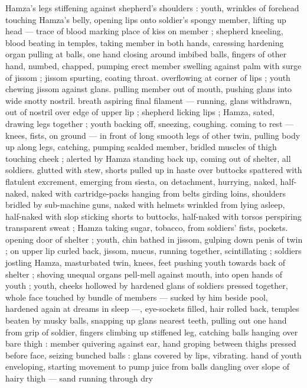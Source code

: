 Hamza's legs stiffening against shepherd's shoulders : youth, 
wrinkles of forehead touching Hamza's belly, opening lips onto 
soldier's spongy member, lifting up head --- trace of blood marking 
place of kiss on member ; shepherd kneeling, blood beating in 
temples, taking member in both hands, caressing hardening organ 
pulling at balls, one hand closing around imbibed balls, fingers of 
other hand, numbed, chapped, pumping erect member swelling 
against palm with surge of jissom ; jissom spurting, coating throat. 
overflowing at corner of lips ; youth chewing jissom against glans. 
pulling member out of mouth, pushing glans into wide snotty nostril. 
breath aspiring final filament --- running, glans withdrawn, out of 
nostril over edge of upper lip ; shepherd licking lips ; Hamza, sated, 
drawing legs together ; youth backing off, sneezing, coughing. 
coming to rest --- knees, fists, on ground --- in front of long smooth 
legs of other twin, pulling body up along legs, catching, pumping 
scalded member, bridled muscles of thigh touching cheek ; alerted 
by Hamza standing back up, coming out of shelter, all soldiers. 
glutted with stew, shorts pulled up in haste over buttocks spattered 
with flatulent excrement, emerging from siesta, on detachment, 
hurrying, naked, half-naked, naked with cartridge-packs hanging 
from belts girding loins, shoulders bridled by sub-machine guns, 
naked with helmets wrinkled from lying asleep, half-naked with slop 
sticking shorts to buttocks, half-naked with torsos perspiring 
transparent sweat ; Hamza taking sugar, tobacco, from soldiers' fists, 
pockets. opening door of shelter ; youth, chin bathed in jissom, 
gulping down penis of twin ; on upper lip curled back, jissom, mucus, 
running together, scintillating ; soldiers jostling Hamza, masturbated 
twin, knees, feet pushing youth towards back of shelter ; shoving 
unequal organs pell-mell against mouth, into open hands of youth ; 
youth, cheeks hollowed by hardened glans of soldiers pressed 
together, whole face touched by bundle of members --- sucked by 
him beside pool, hardened again at dreams in sleep ---, eye-sockets 
filled, hair rolled back, temples beaten by musky balls, snapping up 
glans nearest teeth, pulling out one hand from grip of soldier, fingers 
climbing up stiffened leg, catching balls hanging over bare thigh : 
member quivering against ear, hand groping between thighs pressed 
before face, seizing bunched balls : glans covered by lips, vibrating. 
hand of youth enveloping, starting movement to pump juice from 
balls dangling over slope of hairy thigh --- sand running through dry 
